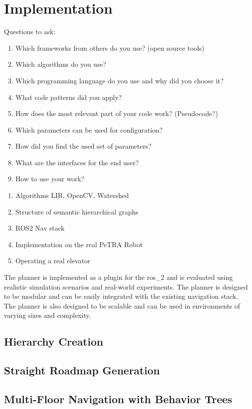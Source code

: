 \chapter{Implementation}
\label{sec:implementation}
Questions to ask:
\begin{enumerate}
    \item Which frameworks from others do you use? (open source tools)
    \item Which algorithms do you use?
    \item Which programming language do you use and why did you choose it?
    \item What code patterns did you apply?
    \item How does the most relevant part of your code work? (Pseudocode?)
    \item Which parameters can be used for configuration?
    \item How did you find the used set of parameters?   
    \item What are the interfaces for the end user?
    \item How to use your work?
\end{enumerate}

\begin{enumerate}
    \item Algorithms LIR, OpenCV, Watershed
    \item Structure of semantic hierarchical graphs
    \item ROS2 Nav stack
    \item Implementation on the real PeTRA Robot
    \item Operating a real elevator 
\end{enumerate}

The planner is implemented as a plugin for the \gls{ros_2} and is evaluated using realistic simulation scenarios and real-world experiments. The planner is designed to be modular and can be easily integrated with the existing navigation stack. The planner is also designed to be scalable and can be used in environments of varying sizes and complexity.

\section{Hierarchy Creation}
\label{sec:hierarchy_creation}

\section{Straight Roadmap Generation}
\label{sec:roadmap_generation}


\section{Multi-Floor Navigation with Behavior Trees}
\label{sec:multi_floor_behavior_trees}
